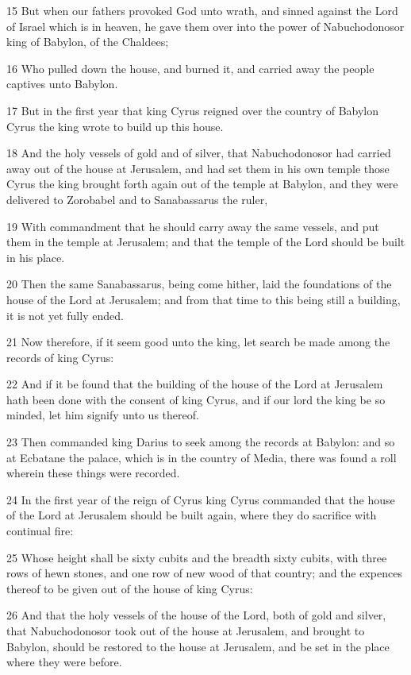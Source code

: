 \par 15 But when our fathers provoked God unto wrath, and sinned against the Lord of Israel which is in heaven, he gave them over into the power of Nabuchodonosor king of Babylon, of the Chaldees;
\par 16 Who pulled down the house, and burned it, and carried away the people captives unto Babylon.
\par 17 But in the first year that king Cyrus reigned over the country of Babylon Cyrus the king wrote to build up this house.
\par 18 And the holy vessels of gold and of silver, that Nabuchodonosor had carried away out of the house at Jerusalem, and had set them in his own temple those Cyrus the king brought forth again out of the temple at Babylon, and they were delivered to Zorobabel and to Sanabassarus the ruler,
\par 19 With commandment that he should carry away the same vessels, and put them in the temple at Jerusalem; and that the temple of the Lord should be built in his place.
\par 20 Then the same Sanabassarus, being come hither, laid the foundations of the house of the Lord at Jerusalem; and from that time to this being still a building, it is not yet fully ended.
\par 21 Now therefore, if it seem good unto the king, let search be made among the records of king Cyrus:
\par 22 And if it be found that the building of the house of the Lord at Jerusalem hath been done with the consent of king Cyrus, and if our lord the king be so minded, let him signify unto us thereof.
\par 23 Then commanded king Darius to seek among the records at Babylon: and so at Ecbatane the palace, which is in the country of Media, there was found a roll wherein these things were recorded.
\par 24 In the first year of the reign of Cyrus king Cyrus commanded that the house of the Lord at Jerusalem should be built again, where they do sacrifice with continual fire:
\par 25 Whose height shall be sixty cubits and the breadth sixty cubits, with three rows of hewn stones, and one row of new wood of that country; and the expences thereof to be given out of the house of king Cyrus:
\par 26 And that the holy vessels of the house of the Lord, both of gold and silver, that Nabuchodonosor took out of the house at Jerusalem, and brought to Babylon, should be restored to the house at Jerusalem, and be set in the place where they were before.
